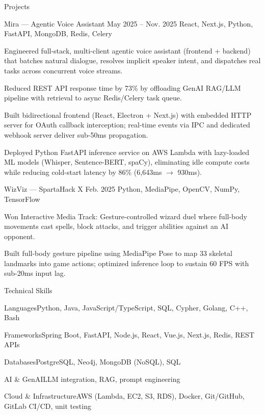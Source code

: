 \documentclass[
	11pt
]{../../../resume}
\begin{document}
	\begin{rSection}{P}{rojects}
		\begin{rSectionEntry}
			{Mira --- Agentic Voice Assistant}
			{May 2025 -- Nov. 2025}
			{}
			{React, Next.js, Python, FastAPI, MongoDB, Redis, Celery}
			{}

			\item Engineered full-stack, multi-client agentic voice assistant (frontend + backend) that batches natural dialogue, resolves implicit speaker intent, and dispatches real tasks across concurrent voice streams.
			\item Reduced REST API response time by 73\% by offloading GenAI RAG/LLM pipeline with retrieval to async Redis/Celery task queue.
			\item Built bidirectional frontend (React, Electron + Next.js) with embedded HTTP server for OAuth callback interception; real-time events via IPC and dedicated webhook server deliver sub-50ms propagation.
			\item Deployed Python FastAPI inference service on AWS Lambda with lazy-loaded ML models (Whisper, Sentence-BERT, spaCy), eliminating idle compute costs while reducing cold-start latency by 86\% (6{,}643ms $\rightarrow$ 930ms).
		\end{rSectionEntry}

		\begin{rSectionEntry}
			{WizViz --- SpartaHack X}
			{Feb. 2025}
			{}
			{Python, MediaPipe, OpenCV, NumPy, TensorFlow}
			{}

			\item Won Interactive Media Track: Gesture-controlled wizard duel where full-body movements cast spells, block attacks, and trigger abilities against an AI opponent.
			\item Built full-body gesture pipeline using MediaPipe Pose to map 33 skeletal landmarks into game actions; optimized inference loop to sustain 60 FPS with sub-20ms input lag.
		\end{rSectionEntry}
	\end{rSection}

	\begin{rSection}{T}{echnical Skills}
		\begin{rSet}{Languages}{Python, Java, JavaScript/TypeScript, SQL, Cypher, Golang, C++, Bash}
		\end{rSet}
		\begin{rSet}{Frameworks}{Spring Boot, FastAPI, Node.js, React, Vue.js, Next.js, Redis, REST APIs}
		\end{rSet}
		\begin{rSet}{Databases}{PostgreSQL, Neo4j, MongoDB (NoSQL), SQL}
		\end{rSet}
		\begin{rSet}{AI \& GenAI}{LLM integration, RAG, prompt engineering}
		\end{rSet}
		\begin{rSet}{Cloud \& Infrastructure}{AWS (Lambda, EC2, S3, RDS), Docker, Git/GitHub, GitLab CI/CD, unit testing}
		\end{rSet}
	\end{rSection}
\end{document}
